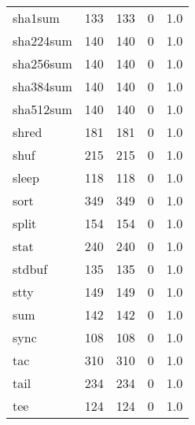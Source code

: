 \begin{longtable}{lrrrr}
sha1sum   &                     133 &              133 &                 0 &                          1.0 \\
sha224sum &                     140 &              140 &                 0 &                          1.0 \\
sha256sum &                     140 &              140 &                 0 &                          1.0 \\
sha384sum &                     140 &              140 &                 0 &                          1.0 \\
sha512sum &                     140 &              140 &                 0 &                          1.0 \\
shred     &                     181 &              181 &                 0 &                          1.0 \\
shuf      &                     215 &              215 &                 0 &                          1.0 \\
sleep     &                     118 &              118 &                 0 &                          1.0 \\
sort      &                     349 &              349 &                 0 &                          1.0 \\
split     &                     154 &              154 &                 0 &                          1.0 \\
stat      &                     240 &              240 &                 0 &                          1.0 \\
stdbuf    &                     135 &              135 &                 0 &                          1.0 \\
stty      &                     149 &              149 &                 0 &                          1.0 \\
sum       &                     142 &              142 &                 0 &                          1.0 \\
sync      &                     108 &              108 &                 0 &                          1.0 \\
tac       &                     310 &              310 &                 0 &                          1.0 \\
tail      &                     234 &              234 &                 0 &                          1.0 \\
tee       &                     124 &              124 &                 0 &                          1.0 \\

\end{longtable}
